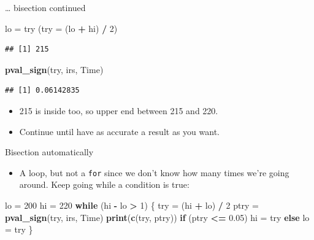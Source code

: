 \documentclass[
  ignorenonframetext,
]{beamer}
\newenvironment{Shaded}{\begin{snugshade}}{\end{snugshade}}
\newcommand{\ControlFlowTok}[1]{\textcolor[rgb]{0.13,0.29,0.53}{\textbf{#1}}}
\newcommand{\DataTypeTok}[1]{\textcolor[rgb]{0.13,0.29,0.53}{#1}}
\newcommand{\DecValTok}[1]{\textcolor[rgb]{0.00,0.00,0.81}{#1}}
\newcommand{\FloatTok}[1]{\textcolor[rgb]{0.00,0.00,0.81}{#1}}
\newcommand{\KeywordTok}[1]{\textcolor[rgb]{0.13,0.29,0.53}{\textbf{#1}}}
\newcommand{\NormalTok}[1]{#1}
\newcommand{\OperatorTok}[1]{\textcolor[rgb]{0.81,0.36,0.00}{\textbf{#1}}}
\newcommand{\StringTok}[1]{\textcolor[rgb]{0.31,0.60,0.02}{#1}}
\providecommand{\tightlist}{%
  \setlength{\itemsep}{0pt}\setlength{\parskip}{0pt}}
\begin{document}
\begin{frame}[fragile]{\ldots{} bisection continued}
\protect\hypertarget{bisection-continued}{}

\begin{Shaded}
\begin{Highlighting}[]
\NormalTok{lo =}\StringTok{ }\NormalTok{try}
\NormalTok{(}\DataTypeTok{try =}\NormalTok{ (lo }\OperatorTok{+}\StringTok{ }\NormalTok{hi) }\OperatorTok{/}\StringTok{ }\DecValTok{2}\NormalTok{)}
\end{Highlighting}
\end{Shaded}

\begin{verbatim}
## [1] 215
\end{verbatim}

\begin{Shaded}
\begin{Highlighting}[]
\KeywordTok{pval_sign}\NormalTok{(try, irs, Time)}
\end{Highlighting}
\end{Shaded}

\begin{verbatim}
## [1] 0.06142835
\end{verbatim}

\begin{itemize}
\tightlist
\item
  215 is inside too, so upper end between 215 and 220.
\item
  Continue until have as accurate a result as you want.
\end{itemize}

\end{frame}

\begin{frame}[fragile]{Bisection automatically}
\protect\hypertarget{bisection-automatically}{}

\begin{itemize}
\tightlist
\item
  A loop, but not a \texttt{for} since we don't know how many times
  we're going around. Keep going while a condition is true:
\end{itemize}

\begin{Shaded}
\begin{Highlighting}[]
\NormalTok{lo =}\StringTok{ }\DecValTok{200}
\NormalTok{hi =}\StringTok{ }\DecValTok{220}
\ControlFlowTok{while}\NormalTok{ (hi }\OperatorTok{-}\StringTok{ }\NormalTok{lo }\OperatorTok{>}\StringTok{ }\DecValTok{1}\NormalTok{) \{}
\NormalTok{  try =}\StringTok{ }\NormalTok{(hi }\OperatorTok{+}\StringTok{ }\NormalTok{lo) }\OperatorTok{/}\StringTok{ }\DecValTok{2}
\NormalTok{  ptry =}\StringTok{ }\KeywordTok{pval_sign}\NormalTok{(try, irs, Time)}
  \KeywordTok{print}\NormalTok{(}\KeywordTok{c}\NormalTok{(try, ptry))}
  \ControlFlowTok{if}\NormalTok{ (ptry }\OperatorTok{<=}\StringTok{ }\FloatTok{0.05}\NormalTok{)}
\NormalTok{    hi =}\StringTok{ }\NormalTok{try}
  \ControlFlowTok{else}
\NormalTok{    lo =}\StringTok{ }\NormalTok{try}
\NormalTok{\}}
\end{Highlighting}
\end{Shaded}

\end{frame}
\end{document}
